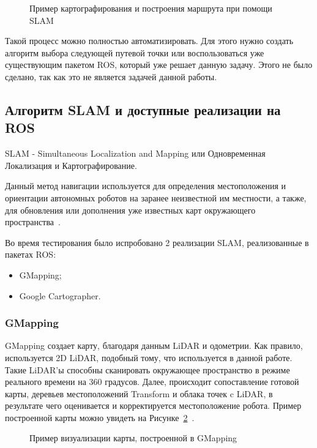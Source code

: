 \begin{figure}[ht]
    \caption{Пример картографирования и построения маршрута при помощи SLAM}\label{fig:path}
\end{figure}

Такой процесс можно полностью автоматизировать. Для этого нужно создать алгоритм выбора следующей путевой точки или воспользоваться уже существующим пакетом ROS, который уже решает данную задачу. Этого не было сделано, так как это не является задачей данной работы.

\subsection{Алгоритм SLAM и доступные реализации на ROS}
SLAM - Simultaneous Localization and Mapping или Одновременная Локализация и Картографирование. 

Данный метод навигации используется для определения местоположения и ориентации автономных роботов на заранее неизвестной им местности, а также, для обновления или дополнения уже известных карт окружающего пространства~\cite{slam}. 

Во время тестирования было испробовано 2 реализации SLAM, реализованные в пакетах ROS:

\begin{itemize}[beginpenalty=10000] %
  \item GMapping;
  \item Google Cartographer.
\end{itemize}

\subsubsection{GMapping}
GMapping создает карту, благодаря данным LiDAR и одометрии. Как правило, используется 2D LiDAR, подобный тому, что используется в данной работе. Такие LiDAR'ы способны сканировать окружающее пространство в режиме реального времени на 360 градусов. Далее, происходит сопоставление готовой карты, деревьев местоположений Transform и облака точек c LiDAR, в результате чего оценивается и корректируется местоположение робота. Пример построенной карты можно увидеть на Рисунке~\cref{fig:gmapping}~\cite{slam}.

\begin{figure}[ht]
    \caption{Пример визуализации карты, построенной в GMapping}\label{fig:gmapping}
\end{figure}

